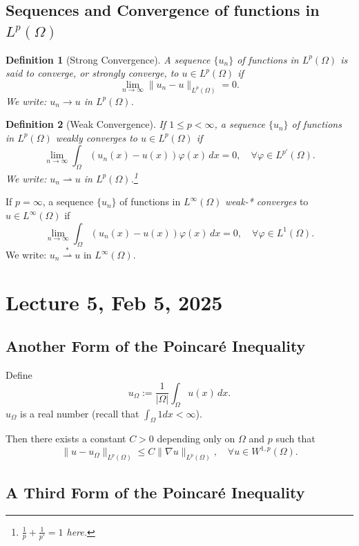 \documentclass[12pt]{report}
\newtheorem{definition}{Definition}[section]
\begin{document}
\subsection{Sequences and Convergence of functions in \(L^p (\Omega)\)}
\begin{definition}[Strong Convergence]
A sequence \( \{ u_n \} \) of functions in \( L^p(\Omega) \) is said to \textit{converge}, or \textit{strongly converge}, to \( u \in L^p(\Omega) \) if
\[
\lim_{n \to \infty} \| u_n - u \|_{L^p(\Omega)} = 0.
\]
We write: \( u_n \to u \) in \( L^p(\Omega) \).
\end{definition}
\begin{definition}[Weak Convergence]
If \( 1 \leq p < \infty \), a sequence \( \{ u_n \} \) of functions in \( L^p(\Omega) \) \textit{weakly} converges to \( u \in L^p(\Omega) \) if
\[
\lim_{n \to \infty} \int_{\Omega} ( u_n(x) - u(x) ) \varphi(x) \, dx = 0, \quad \forall \varphi \in L^{p'}(\Omega).
\]
We write: \( u_n \rightharpoonup u \) in \( L^p(\Omega) \).\footnote{\(\frac{1}{p} + \frac{1}{p'} = 1\) here. }
\end{definition}
If \( p = \infty \), a sequence \( \{ u_n \} \) of functions in \( L^\infty(\Omega) \) \textit{weak-* converges} to \( u \in L^\infty(\Omega) \) if
\[
\lim_{n \to \infty} \int_{\Omega} ( u_n(x) - u(x) ) \varphi(x) \, dx = 0, \quad \forall \varphi \in L^1(\Omega).
\]
We write: \( u_n \overset{*}{\rightharpoonup} u \) in \( L^\infty(\Omega) \).

\section{Lecture 5, Feb 5, 2025}

\subsection{Another Form of the Poincaré Inequality}

Define 
\[
u_\Omega := \frac{1}{|\Omega|} \int_{\Omega} u(x) \,dx.
\]
$u_\Omega$ is a real number (recall that $\int_{\Omega} 1 dx < \infty$). 

Then there exists a constant $C > 0$ depending only on $\Omega$ and $p$ such that
\[
\| u - u_\Omega \|_{L^p(\Omega)} \leq C \| \nabla u \|_{L^p(\Omega)}, \quad \forall u \in W^{1,p}(\Omega).
\]

\subsection{A Third Form of the Poincaré Inequality}
\end{document}
